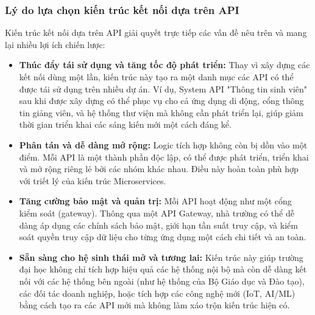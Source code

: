 \subsubsection{Lý do lựa chọn kiến trúc kết nối dựa trên API}
Kiến trúc kết nối dựa trên API giải quyết trực tiếp các vấn đề nêu trên và mang lại nhiều lợi ích chiến lược:
\begin{itemize}
    \item \textbf{Thúc đẩy tái sử dụng và tăng tốc độ phát triển:} Thay vì xây dựng các kết nối dùng một lần, kiến trúc này tạo ra một danh mục các API có thể được tái sử dụng trên nhiều dự án. Ví dụ, System API "Thông tin sinh viên" sau khi được xây dựng có thể phục vụ cho cả ứng dụng di động, cổng thông tin giảng viên, và hệ thống thư viện mà không cần phát triển lại, giúp giảm thời gian triển khai các sáng kiến mới một cách đáng kể.
    \item \textbf{Phân tán và dễ dàng mở rộng:} Logic tích hợp không còn bị dồn vào một điểm. Mỗi API là một thành phần độc lập, có thể được phát triển, triển khai và mở rộng riêng lẻ bởi các nhóm khác nhau. Điều này hoàn toàn phù hợp với triết lý của kiến trúc Microservices.
    \item \textbf{Tăng cường bảo mật và quản trị:} Mỗi API hoạt động như một cổng kiểm soát (gateway). Thông qua một API Gateway, nhà trường có thể dễ dàng áp dụng các chính sách bảo mật, giới hạn tần suất truy cập, và kiểm soát quyền truy cập dữ liệu cho từng ứng dụng một cách chi tiết và an toàn.
    \item \textbf{Sẵn sàng cho hệ sinh thái mở và tương lai:} Kiến trúc này giúp trường đại học không chỉ tích hợp hiệu quả các hệ thống nội bộ mà còn dễ dàng kết nối với các hệ thống bên ngoài (như hệ thống của Bộ Giáo dục và Đào tạo), các đối tác doanh nghiệp, hoặc tích hợp các công nghệ mới (IoT, AI/ML) bằng cách tạo ra các API mới mà không làm xáo trộn kiến trúc hiện có.
\end{itemize}